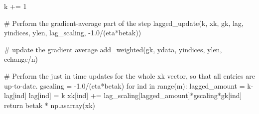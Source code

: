 \documentclass{article}
\begin{document}
\begin{python}
            k += 1
            
            # Perform the gradient-average part of the step
            lagged_update(k, xk, gk, lag, yindices, ylen, lag_scaling, -1.0/(eta*betak))
            
            # update the gradient average
            add_weighted(gk, ydata, yindices, ylen, cchange/n) 
    
    # Perform the just in time updates for the whole xk vector, so that all entries are up-to-date.
    gscaling = -1.0/(eta*betak)
    for ind in range(m):
        lagged_amount = k-lag[ind]
        lag[ind] = k
        xk[ind] += lag_scaling[lagged_amount]*gscaling*gk[ind]
    return betak * np.asarray(xk)
\end{python}
\end{document}
